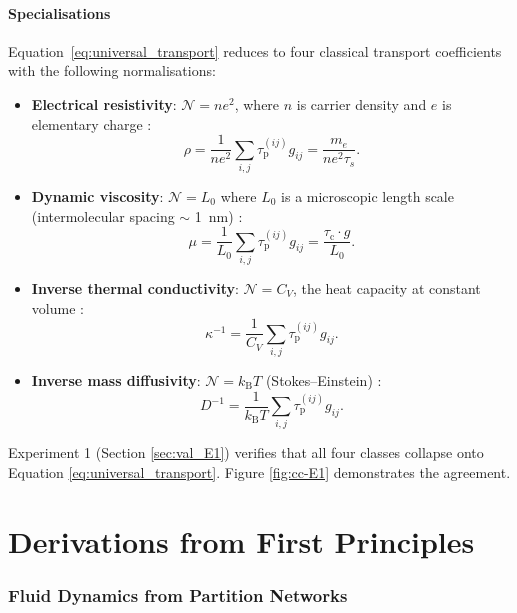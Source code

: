 \documentclass[twocolumn,10pt,a4paper]{article}
\theoremstyle{definition}
\theoremstyle{remark}
\newcommand{\kB}{k_{\mathrm{B}}}
\newcommand{\tauP}{\tau_{\mathrm{p}}}
\newcommand{\tauC}{\tau_{\mathrm{c}}}
\newcommand{\Norm}{\mathcal{N}}
\begin{document}
\subsection{Specialisations}

Equation~\eqref{eq:universal_transport} reduces to four classical transport coefficients with the following normalisations:

\begin{itemize}[leftmargin=1.2em,nosep]
\item \textbf{Electrical resistivity}: $\Norm = ne^2$, where $n$ is carrier density and $e$ is elementary charge \citep{drude1900a,sommerfeld1928}:
\[
\rho = \frac{1}{ne^2}\sum_{i,j} \tauP^{(ij)} g_{ij} = \frac{m_e}{ne^2 \tau_s}.
\]
\item \textbf{Dynamic viscosity}: $\Norm = L_0$ where $L_0$ is a microscopic length scale (intermolecular spacing $\sim$ 1~nm) \citep{chapman1990,landau1987fluid}:
\[
\mu = \frac{1}{L_0}\sum_{i,j} \tauP^{(ij)} g_{ij} = \frac{\tauC \cdot g}{L_0}.
\]
\item \textbf{Inverse thermal conductivity}: $\Norm = C_V$, the heat capacity at constant volume \citep{ashcroft1976}:
\[
\kappa^{-1} = \frac{1}{C_V}\sum_{i,j} \tauP^{(ij)} g_{ij}.
\]
\item \textbf{Inverse mass diffusivity}: $\Norm = \kB T$ (Stokes--Einstein) \citep{einstein1905brownian}:
\[
D^{-1} = \frac{1}{\kB T}\sum_{i,j} \tauP^{(ij)} g_{ij}.
\]
\end{itemize}

Experiment 1 (Section \ref{sec:val_E1}) verifies that all four classes collapse onto Equation \eqref{eq:universal_transport}. Figure \ref{fig:cc-E1} demonstrates the agreement.



\part{Derivations from First Principles}

\section{Fluid Dynamics from Partition Networks}
\label{sec:fluids}
\end{document}
